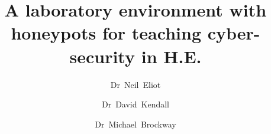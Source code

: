 %
%
%
%
%
%
\RequirePackage{fix-cm}
%
\documentclass[smallextended]{svjour3}       %
%
\smartqed  %
%
\usepackage{graphicx}
%
%
%
%
%


\title{A laboratory environment with honeypots for teaching cyber-security in H.E.%
}


\author{Dr~Neil~Eliot \and
        Dr~David~Kendall \and
        Dr~Michael~Brockway
}


